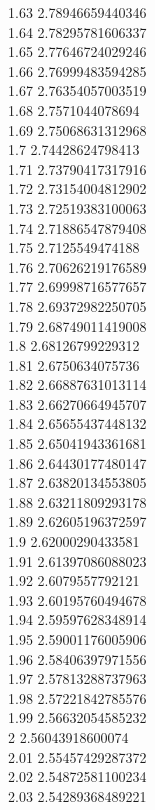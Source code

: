 {1.63	2.78946659440346\\
1.64	2.78295781606337\\
1.65	2.77646724029246\\
1.66	2.76999483594285\\
1.67	2.76354057003519\\
1.68	2.7571044078694\\
1.69	2.75068631312968\\
1.7	2.74428624798413\\
1.71	2.73790417317916\\
1.72	2.73154004812902\\
1.73	2.72519383100063\\
1.74	2.71886547879408\\
1.75	2.7125549474188\\
1.76	2.70626219176589\\
1.77	2.69998716577657\\
1.78	2.69372982250705\\
1.79	2.68749011419008\\
1.8	2.68126799229312\\
1.81	2.6750634075736\\
1.82	2.66887631013114\\
1.83	2.66270664945707\\
1.84	2.65655437448132\\
1.85	2.65041943361681\\
1.86	2.64430177480147\\
1.87	2.63820134553805\\
1.88	2.63211809293178\\
1.89	2.62605196372597\\
1.9	2.62000290433581\\
1.91	2.61397086088023\\
1.92	2.6079557792121\\
1.93	2.60195760494678\\
1.94	2.59597628348914\\
1.95	2.59001176005906\\
1.96	2.58406397971556\\
1.97	2.57813288737963\\
1.98	2.57221842785576\\
1.99	2.56632054585232\\
2	2.56043918600074\\
2.01	2.55457429287372\\
2.02	2.54872581100234\\
2.03	2.54289368489221\\
}
